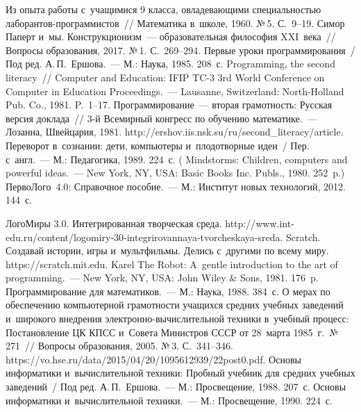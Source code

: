 \begin{multicols}{2}
{{\begin{thebibliography}{99}
   Из опыта работы с~учащимися 9 класса, овладевающими 
специальностью лаборантов-про\-грам\-ми\-стов~// Математика в~школе, 1960. №\,5. С.~9--19.
   Симор Паперт и~мы. Конструкционизм~--- образовательная 
философия XXI~века~// Вопросы образования, 2017. №\,1. С.~269--294. 
   Первые уроки программирования~/ Под ред. А.\,П.~Ершова.~--- 
М.: Наука, 1985. 208~с. %
 Programming, the second literacy~// Computer and Education: 
IFIP TC-3 3rd World Conference on Computer in Education Proceedings.~--- 
Lausanne, Switzerland: North-Holland Pub. Co., 1981. P.~1--17.
   Программирование~--- вторая грамотность: Русская версия доклада~// 
3-й Всемирный конгресс по обучению математике.~--- Лозанна,  Швейцария, 1981. {\sf 
http://ershov.iis.nsk.su/ru/\linebreak second\_literacy/article}. 
   Переворот в~сознании: дети, компьютеры и~плодотворные идеи~/ Пер. 
  с~англ.~--- М.: Педагогика, 1989. 224~с. ( Mindstorms: Children, computers and 
powerful ideas.~--- New York, NY, USA: Basic Books Inc. Publs., 1980. 252~p.)
   ПервоЛого~4.0: Справочное 
пособие.~--- М.: Институт новых технологий, 2012. 144~с.
\pagebreak

  ЛогоМиры 3.0. Интегрированная творческая среда. {\sf http://www.int-edu.ru/content/logomiry-30-integrirovannaya-tvorcheskaya-sreda}.
    Scratch. Создавай истории, игры и~мультфильмы. Делись с~другими по всему миру. {\sf 
https://scratch.mit.edu}.
   Karel The Robot: A~gentle introduction to the art of programming.~---  New York, NY, USA: 
John Wiley \& Sons, 1981. 176~p. 
   Программирование для математиков.~--- 
М.: Наука, 1988. 384~с.
  О мерах по обеспечению компьютерной грамот\-ности учащихся средних учебных 
заведений и~широкого внедрения электронно-вычислительной техники в~учебный процесс: 
Постановление ЦК КПСС и~Совета Министров СССР от 28~марта 1985~г.\ №\,271~// 
Вопросы образования, 2005. №\,3. С.~341--346.
{\sf 
https://vo.\linebreak hse.ru/data/2015/04/20/1095612939/22post0.pdf}.
Основы информатики и~вы\-чис\-ли\-тель\-ной техники: Пробный учебник для средних учебных 
заведений~/ Под ред. А.\,П.~Ершова.~--- М.: Просвещение, 1988. 207~с. 
   Основы информатики 
  и~вычислительной техники.~--- М.: Просвещение, 1990. 224~с. 


\end{thebibliography}}}
\end{multicols}
